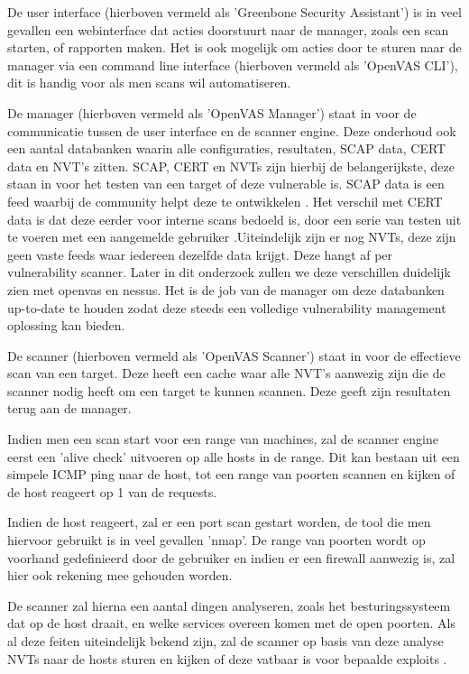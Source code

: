 De user interface (hierboven vermeld als 'Greenbone Security Assistant') is in veel gevallen een webinterface dat acties doorstuurt naar de manager, zoals een scan starten, of rapporten maken. Het is ook mogelijk om acties door te sturen naar de manager via een command line interface (hierboven vermeld als 'OpenVAS CLI'), dit is handig voor als men scans wil automatiseren.

De manager (hierboven vermeld als 'OpenVAS Manager') staat in voor de communicatie tussen de user interface en de scanner engine. Deze onderhoud ook een aantal databanken waarin alle configuraties, resultaten, SCAP data, CERT data en NVT's zitten. SCAP, CERT en NVTs zijn hierbij de belangerijkste, deze staan in voor het testen van een target of deze vulnerable is. SCAP data is een feed waarbij de community helpt deze te ontwikkelen \textcite{whatis-scap}. Het verschil met CERT data is dat deze eerder voor interne scans bedoeld is, door een serie van testen uit te voeren met een aangemelde gebruiker \textcite{whatis-cert}.Uiteindelijk zijn er nog NVTs, deze zijn geen vaste feeds waar iedereen dezelfde data krijgt. Deze hangt af per vulnerability scanner. Later in dit onderzoek zullen we deze verschillen duidelijk zien met openvas en nessus. Het is de job van de manager om deze databanken up-to-date te houden zodat deze steeds een volledige vulnerability management oplossing kan bieden.

De scanner (hierboven vermeld als 'OpenVAS Scanner') staat in voor de effectieve scan van een target. Deze heeft een cache waar alle NVT's aanwezig zijn die de scanner nodig heeft om een target te kunnen scannen. Deze geeft zijn resultaten terug aan de manager. 

Indien men een scan start voor een range van machines, zal de scanner engine eerst een 'alive check' uitvoeren op alle hosts in de range. Dit kan bestaan uit een simpele ICMP ping naar de host, tot een range van poorten scannen en kijken of de host reageert op 1 van de requests. 

Indien de host reageert, zal er een port scan gestart worden, de tool die men hiervoor gebruikt is in veel gevallen 'nmap'. De range van poorten wordt op voorhand gedefinieerd door de gebruiker en indien er een firewall aanwezig is, zal hier ook rekening mee gehouden worden. 

De scanner zal hierna een aantal dingen analyseren, zoals het besturingssysteem dat op de host draait, en welke services overeen komen met de open poorten. Als al deze feiten uiteindelijk bekend zijn, zal de scanner op basis van deze analyse NVTs naar de hosts sturen en kijken of deze vatbaar is voor bepaalde exploits \textcite{Qualys}.

